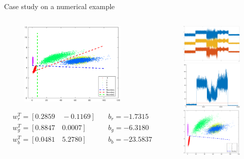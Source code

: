 \documentclass[10pt]{beamer}
\begin{document}
\begin{frame}{Case study on a numerical example}
     \begin{columns}
             \begin{column}{0.5\textwidth}
              \begin{figure}
              \centering
           \includegraphics[width=5cm]{fig/perfectR.eps}
            \end{figure}
            \begin{equation} \nonumber
            \begin{aligned}
         &w_r^T = [0.2859  \quad  -0.1169] \quad &b_r =  -1.7315 \\
         &w_g^T = [0.8847 \quad 0.0007]\quad &b_g =-6.3180  \\
         &w_b^T = [0.0481 \quad 5.2780] \quad &b_b = -23.5837  \\
           \end{aligned}
            \end{equation}
           \end{column}
        \begin{column}{0.5\textwidth}  %
   \begin{figure}
        \centering
        \includegraphics[width=3cm]{fig/Coriginal.eps} \\
        \includegraphics[width=3cm]{fig/thresholdT.eps} \\
        \includegraphics[width=3cm]{fig/miniVarP.eps}
        \end{figure}
        \end{column}
    \end{columns}
\end{frame}
\end{document}
